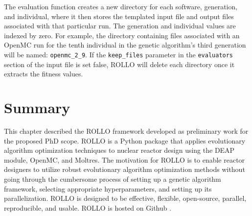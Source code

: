 The evaluation function creates a new directory for each software, generation, 
and individual, where it then stores the templated input file and output files 
associated with that particular run. 
The generation and individual values are indexed by zero. 
For example, the directory containing files associated with an OpenMC run for 
the tenth individual in the genetic algorithm's third generation will be named: 
\texttt{openmc\_2\_9}.
If the \texttt{keep\_files} parameter in the \texttt{evaluators} section of the 
input file is set false, \gls{ROLLO} will delete each directory once it 
extracts the fitness values. 

\section{Summary}
This chapter described the \acrfull{ROLLO} framework developed as
preliminary work for the proposed PhD scope.
\gls{ROLLO} is a Python package that applies evolutionary algorithm 
optimization techniques to nuclear reactor design using the \acrfull{DEAP} 
module, OpenMC, and Moltres. 
The motivation for \gls{ROLLO} is to enable reactor designers to utilize 
robust evolutionary algorithm optimization methods without going 
through the cumbersome process of setting up a genetic algorithm framework,
selecting appropriate hyperparameters, and setting up its parallelization. 
\gls{ROLLO} is designed to be effective, flexible, open-source, parallel, 
reproducible, and usable. 
\gls{ROLLO} is hosted on Github \cite{chee_rollo_2021}. 